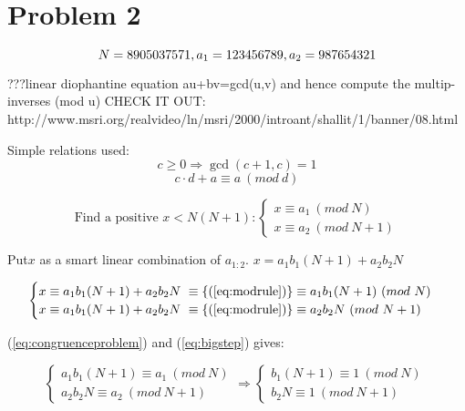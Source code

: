 \documentclass[a4paper,twoside=false,abstract=false,numbers=noenddot,
titlepage=false,headings=small,parskip=half,version=last]{scrartcl}
\begin{document}
\section{Problem 2}
\begin{equation*}
    N=8905037571, \\
    a_{1}=123456789, \\
    a_{2}=987654321
\end{equation*}

???linear diophantine equation au+bv=gcd(u,v) and hence compute the multip-inverses (mod u)
CHECK IT OUT: http://www.msri.org/realvideo/ln/msri/2000/introant/shallit/1/banner/08.html

Simple relations used: 
\begin{equation} \label{eq:gcdplusone}
    c \ge 0 \Rightarrow  \gcd(c+1,c)=1
\end{equation}
\begin{equation} \label{eq:modrule}
    c\cdot d+a \equiv a\ (mod\ d) 
\end{equation}

\begin{equation} \label{eq:congruenceproblem}
    \text{Find a positive } x < N(N+1) : 
    \begin{cases}
        x \equiv a_{1}\ (mod\ N)\\
        x \equiv a_{2}\ (mod\ N+1)
    \end{cases}
\end{equation}

Put$x$ as a smart linear combination of $a_{1:2}$. 
$x=a_{1}b_{1}(N+1)+a_{2}b_{2}N$

\begin{equation} \label{eq:bigstep}
    \begin{cases}
        x \equiv a_{1}b_{1}(N+1)+a_{2}b_{2}N\ \equiv \{(\ref{eq:modrule})\} \equiv a_{1}b_{1}(N+1)\ (mod\ N)\\
        x \equiv a_{1}b_{1}(N+1)+a_{2}b_{2}N\ \equiv \{(\ref{eq:modrule})\} \equiv a_{2}b_{2}N\ (mod\ N+1)
    \end{cases}
\end{equation}

(\ref{eq:congruenceproblem}) and (\ref{eq:bigstep}) gives:

\begin{equation} \label{eq:congruencecombination}
    \begin{cases}
        a_{1}b_{1}(N+1) \equiv a_{1}\ (mod\ N)\\
        a_{2}b_{2}N \equiv a_{2}\ (mod\ N+1)
    \end{cases}
    \Rightarrow
    \begin{cases}
        b_{1}(N+1) \equiv 1\ (mod\ N)\\
        b_{2}N \equiv 1\ (mod\ N+1)
    \end{cases}
\ %
\end{equation}
\end{document}
